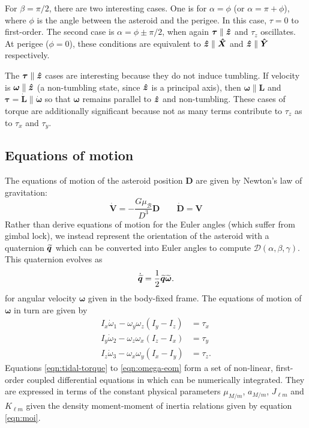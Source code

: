 For $\beta = \pi/2$, there are two interesting cases. One is for $\alpha = \phi$ (or $\alpha = \pi + \phi$), where $\phi$ is the angle between the asteroid and the perigee. In this case, $\tau = 0$ to first-order. The second case is $\alpha = \phi \pm \pi/2$, when again $\bm \tau \parallel \bm{\hat{z}}$ and $\tau_z$ oscillates. At perigee ($\phi=0$), these conditions are equivalent to $\bm{\hat{z}} \parallel \bm{\hat{X}}$ and $\bm{\hat{z}} \parallel \bm{\hat{Y}}$ respectively.

The $\bm \tau \parallel \bm{\hat{z}}$ cases are interesting because they do not induce tumbling. If velocity is $\bm \omega \parallel \bm{\hat{z}}$ (a non-tumbling state, since $\bm{\hat{z}}$ is a principal axis), then $\bm \omega \parallel \bm L$ and $\bm \tau = \dot{\bm L} \parallel \dot{\bm \omega}$ so that $\bm \omega$ remains parallel to $\bm{\hat{z}}$ and non-tumbling. These cases of torque are additionally significant because not as many terms contribute to $\tau_z$ as to $\tau_x$ and $\tau_y$.

\subsection{Equations of motion}
\label{sec:eom}


The equations of motion of the asteroid position $\bm D$ are given by Newton's law of gravitation:
\begin{equation}
  \dot{\bm V} = -\frac{G \mu_\mathcal{B}}{D^3} \bm D \qquad \dot{\bm D} = \bm V
  \label{eqn:pos-eom}
\end{equation}
Rather than derive equations of motion for the Euler angles (which suffer from gimbal lock), we instead represent the orientation of the asteroid with a quaternion $\widetilde{\bm{q}}$ which can be converted into Euler angles to compute $\mathcal{D}(\alpha, \beta, \gamma)$. This quaternion evolves as 
\begin{equation}
  \dot{\widetilde{\bm{q}}} = \frac{1}{2}\widetilde{\bm{q}}\widetilde{\bm{\omega}}.
  \label{eqn:quat-eom}
\end{equation}
for angular velocity $\bm \omega$ given in the body-fixed frame. The equations of motion of $\bm \omega$ in turn are given by
\begin{equation}
  \begin{split}
    I_x \dot \omega_1 - \omega_y \omega_z (I_y - I_z) &= \tau_x\\
    I_y \dot \omega_2 - \omega_z \omega_x (I_z - I_x) &= \tau_y\\
    I_z \dot \omega_3 - \omega_x \omega_y (I_x - I_y) &= \tau_z.
  \end{split}
  \label{eqn:omega-eom}
\end{equation}
Equations \ref{eqn:tidal-torque} to \ref{eqn:omega-eom} form a set of non-linear, first-order coupled differential equations in which can be numerically integrated. They are expressed in terms of the constant physical parameters $\mu_{M/m}$, $a_{M/m}$, $J_{\ell m}$ and $K_{\ell m}$ given the density moment-moment of inertia relations given by equation \ref{eqn:moi}.

